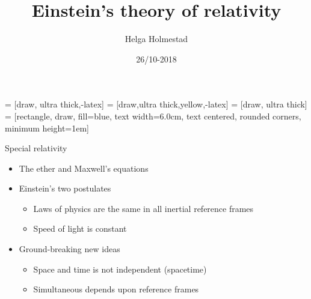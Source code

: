 \documentclass{beamer}
\title[]{Einstein's theory of relativity}
\author{Helga Holmestad}
\institute{University of Oslo}
\date{26/10-2018}
\begin{document}
\begin{frame}
  \titlepage
\end{frame}


   = [draw, ultra thick,-latex]
       = [draw,ultra thick,yellow,-latex]
       = [draw, ultra thick]
       = [rectangle, draw, fill=blue, 
        text width=6.0cm, text centered, rounded corners, minimum height=1em]

\begin{frame}{\centering Special relativity}
  \begin{itemize}
  \item<1->{The ether and Maxwell's equations}
  \item<2->{Einstein's two postulates }
    \begin{itemize}
    \item<2->{Laws of physics are the same in all inertial reference frames}
    \item<2->{Speed of light is constant}
    \end{itemize}
  \item<3->{Ground-breaking new ideas}
    \begin{itemize}
    \item<3->{Space and time is not independent (spacetime)}
    \item<3->{Simultaneous depends upon reference frames}
    \end{itemize}
  \end{itemize}
              

\end{frame}
\end{document}
